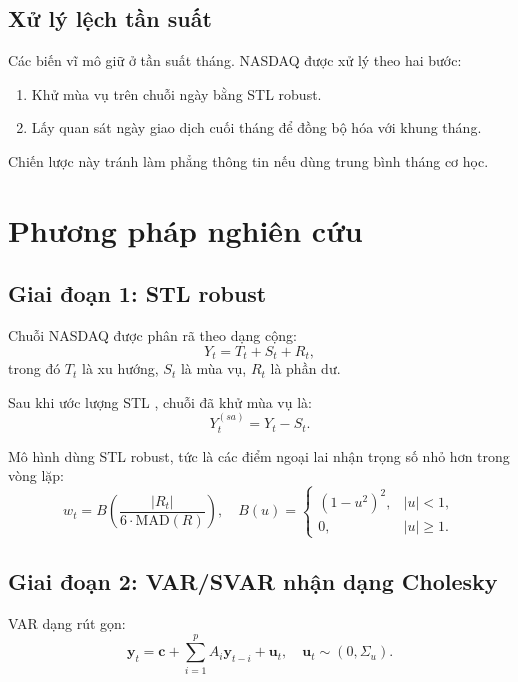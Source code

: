 \documentclass[12pt,a4paper]{article}
\begin{document}
\subsection{Xử lý lệch tần suất}

Các biến vĩ mô giữ ở tần suất tháng. NASDAQ được xử lý theo hai bước:
\begin{enumerate}[leftmargin=1.5em]
    \item Khử mùa vụ trên chuỗi ngày bằng STL robust.
    \item Lấy quan sát ngày giao dịch cuối tháng để đồng bộ hóa với khung tháng.
\end{enumerate}

Chiến lược này tránh làm phẳng thông tin nếu dùng trung bình tháng cơ học.

\section{Phương pháp nghiên cứu}

\subsection{Giai đoạn 1: STL robust}

Chuỗi NASDAQ được phân rã theo dạng cộng:
\begin{equation}
Y_t = T_t + S_t + R_t,
\end{equation}
trong đó \(T_t\) là xu hướng, \(S_t\) là mùa vụ, \(R_t\) là phần dư.

Sau khi ước lượng STL \citep{cleveland1990}, chuỗi đã khử mùa vụ là:
\begin{equation}
Y_t^{(sa)} = Y_t - S_t.
\end{equation}

Mô hình dùng STL robust, tức là các điểm ngoại lai nhận trọng số nhỏ hơn trong vòng lặp:
\begin{equation}
w_t = B\!\left(\frac{|R_t|}{6\cdot \text{MAD}(R)}\right), \quad
B(u)=
\begin{cases}
(1-u^2)^2,& |u|<1,\\
0,& |u|\ge 1.
\end{cases}
\end{equation}

\subsection{Giai đoạn 2: VAR/SVAR nhận dạng Cholesky}

VAR dạng rút gọn:
\begin{equation}
\bm{y}_t = \bm{c} + \sum_{i=1}^{p} A_i \bm{y}_{t-i} + \bm{u}_t,\quad
\bm{u}_t \sim (0,\Sigma_u).
\end{equation}
\end{document}
